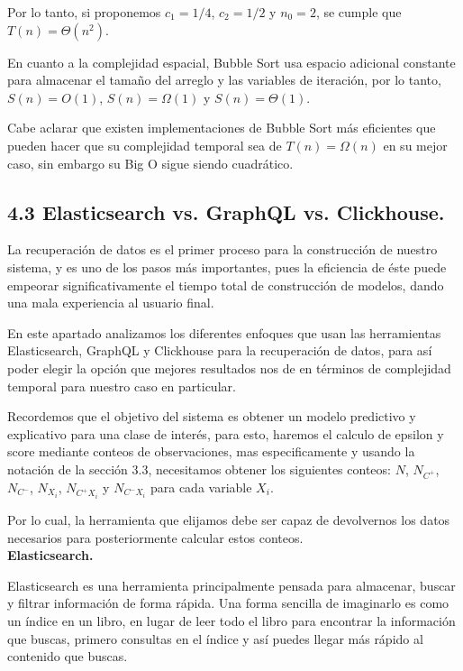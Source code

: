 \documentclass[
 12pt,
 letterpaper,
]{article}
\theoremstyle{teoremaBreak}
\theoremstyle{plain}
\theoremstyle{definition}
\begin{document}
Por lo tanto, si proponemos $c_1 = 1/4$, $c_2 = 1/2$ y $n_0 = 2$, se cumple que $T(n) = \Theta(n^2)$.

En cuanto a la complejidad espacial, Bubble Sort usa espacio adicional constante para almacenar el tamaño del arreglo y 
las variables de iteración, por lo tanto, $S(n) = O(1)$, $S(n) = \Omega(1)$ y $S(n) = \Theta(1)$.

Cabe aclarar que existen implementaciones de Bubble Sort más eficientes que pueden hacer que 
su complejidad temporal sea de $T(n) = \Omega(n)$ en su mejor caso, sin embargo su Big O sigue siendo 
cuadrático.


\subsection{4.3 Elasticsearch vs. GraphQL vs. Clickhouse.}\label{elasticsearch-vs.-graphql-vs.-clickhouse.}

La recuperación de datos es el primer proceso para la construcción de nuestro sistema, y 
es uno de los pasos más importantes, pues la eficiencia de éste puede empeorar significativamente 
el tiempo total de construcción de modelos, dando una mala experiencia al usuario final.

En este apartado analizamos los diferentes enfoques que usan las herramientas Elasticsearch, GraphQL y Clickhouse 
para la recuperación de datos, para así poder elegir la opción que mejores resultados nos de en términos de 
complejidad temporal para nuestro caso en particular.

Recordemos que el objetivo del sistema es obtener un modelo predictivo y explicativo para una clase de interés, 
para esto, haremos el calculo de epsilon y score mediante conteos de observaciones, mas especificamente y usando 
la notación de la sección 3.3, necesitamos obtener los siguientes conteos:
$N$, $N_{C^+}$, $N_{C^-}$, $N_{X_i}$, $N_{C^+ X_i}$ y $N_{C^- X_i}$ para cada variable $X_i$.

Por lo cual, la herramienta que elijamos debe ser capaz de devolvernos los datos necesarios para 
posteriormente calcular estos conteos. \\

\textbf{Elasticsearch.}

Elasticsearch es una herramienta principalmente pensada para almacenar, buscar y filtrar información de forma rápida. 
Una forma sencilla de imaginarlo es como un índice en un libro, en lugar de leer todo el libro para encontrar 
la información que buscas, primero consultas en el índice y así puedes llegar más rápido al contenido que buscas.
\end{document}
